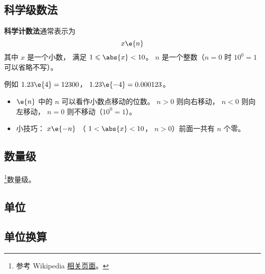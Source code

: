 
\begin{issues}
\issueDraft
\end{issues}

\subsection{科学级数法}
\textbf{科学计数法}通常表示为
\begin{equation}
x \e{n}
\end{equation}
其中 $x$ 是一个小数， 满足 $1 \leqslant \abs{x} < 10$。 $n$ 是一个整数（$n=0$ 时 $10^{0} = 1$ 可以省略不写）。

例如 $1.23\e{4} = 12300$， $1.23\e{-4} = 0.000123$。

\begin{itemize}
\item $\e{n}$ 中的 $n$ 可以看作小数点移动的位数。 $n > 0$ 则向右移动， $n < 0$ 则向左移动， $n=0$ 则不移动（$10^{0} = 1$）。
\item 小技巧： $x\e{-n}$ （ $1 < \abs{x} < 10$， $n > 0$）前面一共有 $n$ 个零。
\end{itemize}

\subsection{数量级}
\footnote{参考 Wikipedia \href{https://en.wikipedia.org/wiki/Order_of_magnitude}{相关页面}。}数量级。

\subsection{单位}

\subsection{单位换算}
